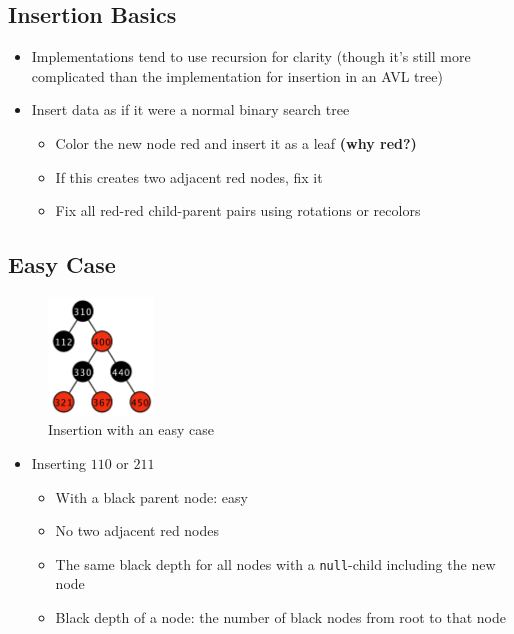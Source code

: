 \documentclass[
  10pt,
  english,
  letterpaper,
,tablecaptionabove
]{scrartcl}
\newcommand{\passthrough}[1]{#1}
\providecommand{\tightlist}{%
  \setlength{\itemsep}{0pt}\setlength{\parskip}{0pt}}
\begin{document}
\hypertarget{insertion-basics}{%
\subsection{Insertion Basics}\label{insertion-basics}}

\begin{itemize}
\tightlist
\item
  Implementations tend to use recursion for clarity (though it's still
  more complicated than the implementation for insertion in an AVL tree)
\item
  Insert data as if it were a normal binary search tree

  \begin{itemize}
  \tightlist
  \item
    Color the new node red and insert it as a leaf \textbf{(why red?)}
  \item
    If this creates two adjacent red nodes, fix it
  \item
    Fix all red-red child-parent pairs using rotations or recolors
  \end{itemize}
\end{itemize}

\hypertarget{easy-case}{%
\subsection{Easy Case}\label{easy-case}}

\begin{figure}
\centering
\includegraphics[width=0.25\textwidth,height=\textheight]{images/1.png}
\caption{Insertion with an easy case}
\end{figure}

\begin{itemize}
\tightlist
\item
  Inserting \(110\) or \(211\)

  \begin{itemize}
  \tightlist
  \item
    With a black parent node: easy
  \item
    No two adjacent red nodes
  \item
    The same black depth for all nodes with a
    \passthrough{\lstinline!null!}-child including the new node
  \item
    Black depth of a node: the number of black nodes from root to that
    node
  \end{itemize}
\end{itemize}
\end{document}
